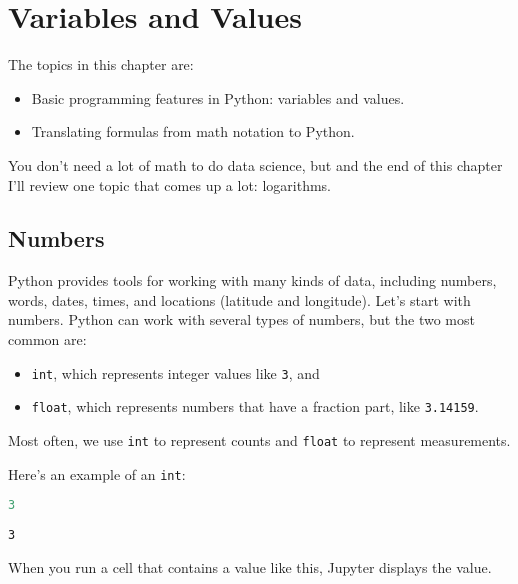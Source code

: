 \chapter{Variables and Values}\label{variables-and-values}

The topics in this chapter are:

\begin{itemize}
\item
  Basic programming features in Python: variables and values.
\item
  Translating formulas from math notation to Python.
\end{itemize}

You don't need a lot of math to do data science, but and the end of this
chapter I'll review one topic that comes up a lot: logarithms.

\section{Numbers}\label{numbers}

Python provides tools for working with many kinds of data, including
numbers, words, dates, times, and locations (latitude and longitude).
Let's start with numbers. Python can work with several types of numbers,
but the two most common are:

\begin{itemize}
\item
  \passthrough{\lstinline!int!}, which represents integer values like
  \passthrough{\lstinline!3!}, and
\item
  \passthrough{\lstinline!float!}, which represents numbers that have a
  fraction part, like \passthrough{\lstinline!3.14159!}.
\end{itemize}

Most often, we use \passthrough{\lstinline!int!} to represent counts and
\passthrough{\lstinline!float!} to represent measurements.

Here's an example of an \passthrough{\lstinline!int!}:

\begin{lstlisting}[language=Python,style=source]
3
\end{lstlisting}

\begin{lstlisting}[style=output]
3
\end{lstlisting}

When you run a cell that contains a value like this, Jupyter displays
the value.

